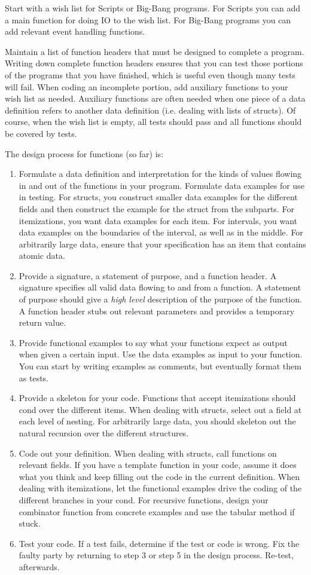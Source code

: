\documentclass{article}
\begin{document}
Start with a wish list for Scripts or Big-Bang programs. For Scripts you
can add a main function for doing IO to the wish list. For Big-Bang programs
you can add relevant event handling functions.

Maintain a list of function headers that must be designed to complete a program. Writing down complete function headers ensures that you can test those portions of the programs that you have finished, which is useful even though many tests will fail. When coding an incomplete portion, add auxiliary functions to your wish list as needed. Auxiliary functions are often needed when one piece of a data definition refers to another data definition (i.e. dealing with lists of structs). Of course, when the wish list is empty, all tests should pass and all functions should be covered by tests.

The design process for functions (so far) is:
\begin{enumerate}
\item Formulate a data definition and
  interpretation for the kinds of values flowing in
  and out of the functions in your program. Formulate data examples for use in
  testing. For structs, you construct smaller data examples for the different fields
  and then construct the example for the struct from the subparts.
  For itemizations, you want data examples for each item. For intervals,
  you want data examples on the boundaries of the interval, as well as in the middle. For arbitrarily large data, ensure that your specification has an item
  that contains atomic data.
\item Provide a signature, a statement of purpose, and a function header.
  A signature specifies all valid data flowing to and from a function.
  A statement of purpose should give a \emph{high level} description of the purpose
  of the function. A function header stubs out relevant parameters and provides a
  temporary return value.
\item Provide functional examples to say what your functions expect as output
  when given a certain input. Use the data examples as input to your function.
  You can start by writing examples as comments, but eventually format them as
  tests. 
\item Provide a skeleton for your code. Functions that accept itemizations should
  cond over the different items. When dealing with structs, select out a field
  at each level of nesting.
  For arbitrarily large data, you should skeleton
  out the natural recursion over the different structures.
\item Code out your definition. When dealing with structs, call functions on relevant
  fields. If you have a template function in your code, assume it does what you
  think and keep filling out the code in the current definition. When dealing
  with itemizations, let the functional examples drive the coding of the
  different branches in your cond. For recursive functions, design your combinator
  function from concrete examples and use the tabular method if stuck.
\item Test your code. If a test fails, determine if the test or code is wrong.
  Fix the faulty party by returning to step 3 or step 5 in the design process.
  Re-test, afterwards.
\end{enumerate}
\end{document}
